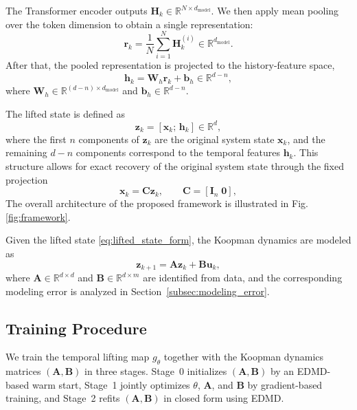 \documentclass[journal]{IEEEtran}
\newcommand{\vx}{\mathbf{x}}
\newcommand{\vu}{\mathbf{u}}
\newcommand{\vz}{\mathbf{z}}
\newcommand{\vh}{\mathbf{h}}
\newcommand{\vr}{\mathbf{r}}
\newcommand{\vb}{\mathbf{b}}
\newcommand{\mA}{\mathbf{A}}
\newcommand{\mB}{\mathbf{B}}
\newcommand{\mC}{\mathbf{C}}
\newcommand{\mW}{\mathbf{W}}
\newcommand{\mH}{\mathbf{H}}
\newcommand{\mI}{\mathbf{I}}
\begin{document}
 The Transformer encoder outputs $\mH_k \in \mathbb{R}^{N \times d_{\mathrm{model}}}$. We then apply mean pooling over
  the token dimension to obtain a single representation:
\begin{equation}
    \vr_k = \frac{1}{N}\sum_{i=1}^{N} \mH_k^{(i)}
    \in \mathbb{R}^{d_{\mathrm{model}}}.
    \label{eq:pooling}
\end{equation}
After that, the pooled representation is projected to the history-feature space,
\begin{equation}
    \vh_k = \mW_h \vr_k + \vb_h \in \mathbb{R}^{d-n},
    \label{eq:history_feature}
\end{equation}
where $\mW_h \in \mathbb{R}^{(d-n)\times d_{\mathrm{model}}}$ and
$\vb_h \in \mathbb{R}^{d-n}$.

The lifted state is defined as
\begin{equation}
    \vz_k = [\vx_k;\,\vh_k] \in \mathbb{R}^{d},
    \label{eq:lifted_state_form}
\end{equation}
where the first $n$ components of $\vz_k$ are the original system state $\vx_k$, and the remaining $d-n$ components correspond to the temporal features $\vh_k$. This structure allows for exact recovery of the original system state through the fixed projection
\begin{equation}
    \vx_k = \mC \vz_k, \qquad \mC = [\mI_n\;\mathbf{0}],
    \label{eq:decoder_projection}
\end{equation}
The overall architecture of the proposed framework is illustrated in Fig. \ref{fig:framework}.

Given the lifted state \eqref{eq:lifted_state_form}, the Koopman dynamics are modeled as
\begin{equation}
    \vz_{k+1} = \mA \vz_k + \mB \vu_k,
    \label{eq:temporal_dynamics}
\end{equation}
where $\mA \in \mathbb{R}^{d\times d}$ and $\mB \in \mathbb{R}^{d\times m}$ are identified from data, and the corresponding modeling error is analyzed in Section~\ref{subsec:modeling_error}.

\subsection{Training Procedure}
\label{sec:training}

We train the temporal lifting map $g_\theta$ together with the Koopman dynamics matrices $(\mA,\mB)$ in three stages. Stage~0 initializes $(\mA,\mB)$ by an EDMD-based warm start, Stage~1 jointly optimizes $\theta$, $\mA$, and $\mB$ by gradient-based training, and Stage~2 refits $(\mA,\mB)$ in closed form using EDMD.
\end{document}
